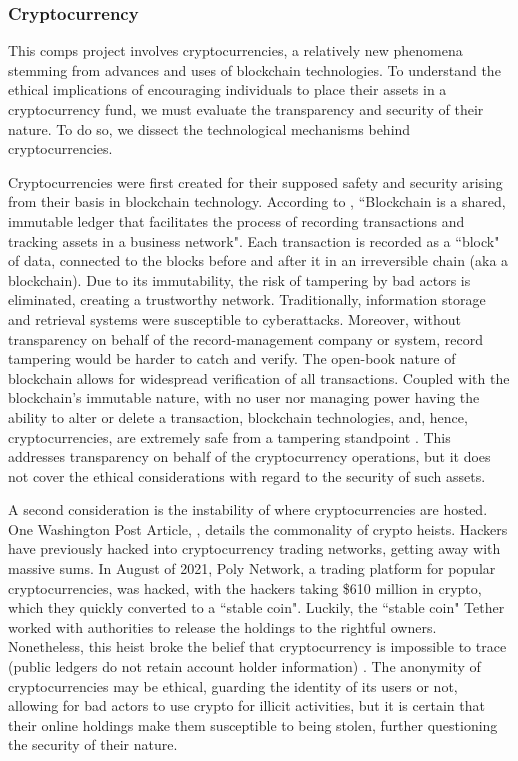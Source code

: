 \documentclass[10pt,twocolumn]{article}
\begin{document}
\subsubsection{Cryptocurrency}

This comps project involves cryptocurrencies, a relatively new phenomena stemming from advances and uses of blockchain technologies. To understand the ethical implications of encouraging individuals to place their assets in a cryptocurrency fund, we must evaluate the transparency and security of their nature. To do so, we dissect the technological mechanisms behind cryptocurrencies.

Cryptocurrencies were first created for their supposed safety and security arising from their basis in blockchain technology. According to , ``Blockchain is a shared, immutable ledger that facilitates the process of recording transactions and tracking assets in a business network". Each transaction is recorded as a ``block" of data, connected to the blocks before and after it in an irreversible chain (aka a blockchain). Due to its immutability, the risk of tampering by bad actors is eliminated, creating a trustworthy network. Traditionally, information storage and retrieval systems were susceptible to cyberattacks. Moreover, without transparency on behalf of the record-management company or system, record tampering would be harder to catch and verify. The open-book nature of blockchain allows for widespread verification of all transactions. Coupled with the blockchain's immutable nature, with no user nor managing power having the ability to alter or delete a transaction, blockchain technologies, and, hence, cryptocurrencies, are extremely safe from a tampering standpoint \cite{WhatIsBlockchain}. This addresses transparency on behalf of the cryptocurrency operations, but it does not cover the ethical considerations with regard to the security of such assets.

A second consideration is the instability of where cryptocurrencies are hosted. One Washington Post Article, , details the commonality of crypto heists. Hackers have previously hacked into cryptocurrency trading networks, getting away with massive sums. In August of 2021, Poly Network, a trading platform for popular cryptocurrencies, was hacked, with the hackers taking 
\$610 million in crypto, which they quickly converted to a ``stable coin". Luckily, the ``stable coin" Tether worked with authorities to release the holdings to the rightful owners. Nonetheless, this heist broke the belief that cryptocurrency is impossible to trace (public ledgers do not retain account holder information) \cite{TrackingStolenCrypto}. The anonymity of cryptocurrencies may be ethical, guarding the identity of its users or not, allowing for bad actors to use crypto for illicit activities, but it is certain that their online holdings make them susceptible to being stolen, further questioning the security of their nature.
\end{document}
